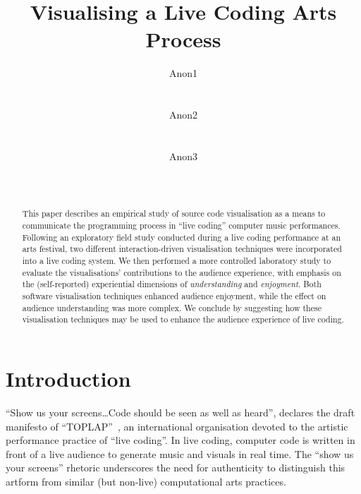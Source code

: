 \documentclass{sig-alternate}
\begin{document}

\title{Visualising a Live Coding Arts Process}

\author{
\alignauthor Anon1\\
       \affaddr{-}\\
       \affaddr{-}\\
       \email{-}
\alignauthor Anon2\\
       \affaddr{-}\\
       \affaddr{-}\\
       \email{-}
\alignauthor Anon3\\
       \affaddr{-}\\
       \affaddr{-}\\
       \email{-}
}

\maketitle
\begin{abstract}
  This paper describes an empirical study of source code visualisation
  as a means to communicate the programming process in ``live coding''
  computer music performances. Following an exploratory field study
  conducted during a live coding performance at an arts festival, two
  different interaction-driven visualisation techniques were
  incorporated into a live coding system. We then performed a more
  controlled laboratory study to evaluate the visualisations' contributions
  to the audience experience, with emphasis on the (self-reported)
  experiential dimensions of \emph{understanding} and
  \emph{enjoyment}. Both software visualisation techniques enhanced
  audience enjoyment, while the effect on audience understanding was
  more complex. We conclude by suggesting how these visualisation
  techniques may be used to enhance the audience experience of live
  coding.
\end{abstract}




\section{Introduction}

``Show us your screens\ldots Code should be seen as well as heard'',
declares the draft manifesto of ``TOPLAP''~\cite{Toplap}, an
international organisation devoted to the artistic performance
practice of ``live coding''. In live coding, computer code is written
in front of a live audience to generate music and visuals in real
time. The ``show us your screens'' rhetoric underscores the need for
authenticity to distinguish this artform from similar (but non-live)
computational arts practices.
\end{document}

